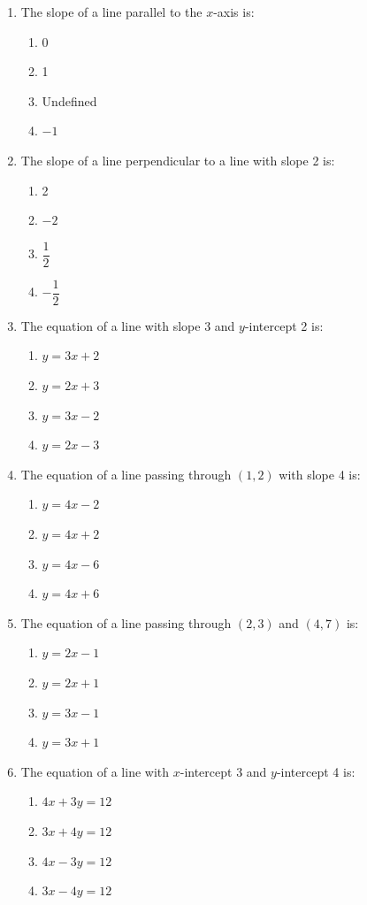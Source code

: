 \documentclass[11pt]{article}
\begin{document}
\begin{enumerate}[label=\textbf{\arabic*.}, start=204, leftmargin=2em]
\item The slope of a line parallel to the $x$-axis is:
\begin{enumerate}[label=(\Alph*)] \item 0 \item 1 \item Undefined \item $-1$ \end{enumerate}

\item The slope of a line perpendicular to a line with slope 2 is:
\begin{enumerate}[label=(\Alph*)] \item 2 \item $-2$ \item $\dfrac{1}{2}$ \item $-\dfrac{1}{2}$ \end{enumerate}

\item The equation of a line with slope 3 and $y$-intercept 2 is:
\begin{enumerate}[label=(\Alph*)] \item $y = 3x + 2$ \item $y = 2x + 3$ \item $y = 3x - 2$ \item $y = 2x - 3$ \end{enumerate}

\item The equation of a line passing through $(1, 2)$ with slope 4 is:
\begin{enumerate}[label=(\Alph*)] \item $y = 4x - 2$ \item $y = 4x + 2$ \item $y = 4x - 6$ \item $y = 4x + 6$ \end{enumerate}

\item The equation of a line passing through $(2, 3)$ and $(4, 7)$ is:
\begin{enumerate}[label=(\Alph*)] \item $y = 2x - 1$ \item $y = 2x + 1$ \item $y = 3x - 1$ \item $y = 3x + 1$ \end{enumerate}

\item The equation of a line with $x$-intercept 3 and $y$-intercept 4 is:
\begin{enumerate}[label=(\Alph*)] \item $4x+3y=12$ \item $3x+4y=12$ \item $4x-3y=12$ \item $3x-4y=12$ \end{enumerate}


\end{enumerate}
\end{document}
